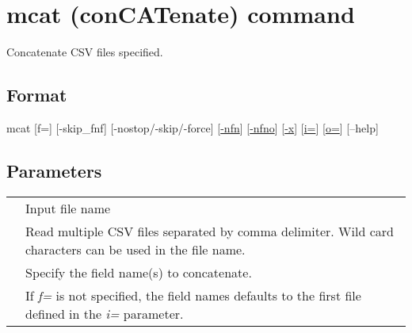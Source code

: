 \documentclass[a4paper]{jarticle}
\begin{document}
\setlength{\baselineskip}{4mm}

\section*{mcat (conCATenate) command}
Concatenate CSV files specified.

\subsection*{Format}
mcat [f=] [-skip\_fnf] [-nostop/-skip/-force] 
[\href{run:option.pdf}{-nfn}] 
[\href{run:option.pdf}{-nfno}] 
[\href{run:option.pdf}{-x}] 
[\href{run:option.pdf}{i=}]
[\href{run:option.pdf}{o=}] 
[--help]\\

\subsection*{Parameters}
\begin{table}[htbp]
{\small
\begin{tabular}{ll}
\verb [i= ] 	& Input file name \\
& Read multiple CSV files separated by comma delimiter. Wild card characters can be used in the file name. \\
\verb [f= ] 	& Specify the field name(s) to concatenate. \\
& If \emph{f=} is not specified, the field names defaults to the first file defined in the \emph{i=} parameter. \\
\end{tabular}
}
\end{table}
\end{document}
